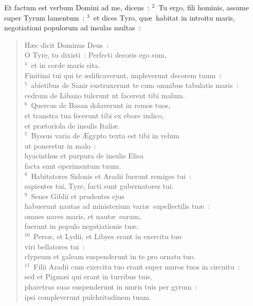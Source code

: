 \lettrine[lines=10,image=true,loversize=0.05,lraise=-0.03]{E}{}t factum est verbum Domini ad me, dicens~:
${}^{2}$~Tu ergo, fili hominis, assume super Tyrum lamentum~:
${}^{3}$~et dices Tyro, qu\ae\ habitat in introitu maris, negotiationi populorum ad insulas multas~: \begin{flushleft}\begin{verse}H\ae c dicit Dominus Deus~:\\ O Tyre, tu dixisti~: Perfecti decoris ego sum,\\
${}^{4}$~et in corde maris sita.\\ Finitimi tui qui te \ae dificaverunt, impleverunt decorem tuum~:\\
${}^{5}$~abietibus de Sanir exstruxerunt te cum omnibus tabulatis maris~:\\ cedrum de Libano tulerunt ut facerent tibi malum.\\
${}^{6}$~Quercus de Basan dolaverunt in remos tuos,\\ et transtra tua fecerunt tibi ex ebore indico,\\ et pr\ae toriola de insulis Itali\ae .\\
${}^{7}$~Byssus varia de \AE gypto texta est tibi in velum\\ ut poneretur in malo~:\\ hyacinthus et purpura de insulis Elisa\\ facta sunt operimentum tuum.\\
${}^{8}$~Habitatores Sidonis et Aradii fuerunt remiges tui~:\\ sapientes tui, Tyre, facti sunt gubernatores tui.\\
${}^{9}$~Senes Giblii et prudentes ejus\\ habuerunt nautas ad ministerium vari\ae\ supellectilis tu\ae~:\\ omnes naves maris, et naut\ae\ earum,\\ fuerunt in populo negotiationis tu\ae .\\
${}^{10}$~Pers\ae , et Lydii, et Libyes erant in exercitu tuo\\ viri bellatores tui~:\\ clypeum et galeam suspenderunt in te pro ornatu tuo.\\
${}^{11}$~Filii Aradii cum exercitu tuo erant super muros tuos in circuitu~:\\ sed et Pigm\ae i qui erant in turribus tuis,\\ pharetras suas suspenderunt in muris tuis per gyrum~:\\ ipsi compleverunt pulchritudinem tuam.\\

\end{verse}
\end{flushleft}
